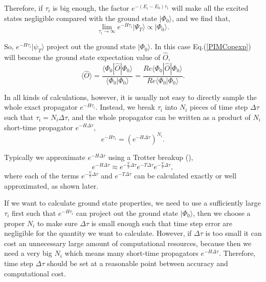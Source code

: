 \documentclass[12pt,letterpaper,UTF8]{report}
\begin{document}
Therefore, if $\tau_i$ is big enough, the factor $e^{-(E_i-E_0) \tau_1}$ will make all the excited states negligible compared with the ground state $| \Phi_0 \rangle$, and we find that,
\begin{equation}
\lim_{\tau_i \rightarrow \infty } e^{-H \tau_i} | \Psi_T  \rangle \propto | \Phi_0 \rangle.
\end{equation}

So, $e^{-H \tau_i} | \psi_T \rangle$ project out the ground state $| \Phi_0 \rangle$.
In this case Eq.(\ref{PIMCopexp}) will become the ground state expectation value of $\hat{O}$,
\begin{equation}
\langle \hat{O} \rangle  = \frac{ \langle \Phi_0 | \hat{O}   | \Phi_0  \rangle }   { \langle \Phi_0 | \Phi_0  \rangle  }
=\frac{ Re \langle \Phi_0 | \hat{O}   | \Phi_0  \rangle }   { Re \langle \Phi_0 | \Phi_0  \rangle  }. \label{PIMCopgndexp}
\end{equation}

In all kinds of calculations, however, it is usually not easy to directly sample the whole exact propagator $e^{-H \tau_i}$.
Instead, we break $\tau_i$ into $N_i$ pieces of time step $\Delta \tau $ such that $\tau_i=N_i \Delta \tau$, and the whole propagator can be written as a product of $N_i$ short-time propagator $e^{-H \Delta \tau}$,
\begin{equation}
e^{-H \tau_i}=  (e^{-H \Delta \tau})^{N_i} . \label{wholepropagator}
\end{equation}

Typically we approximate $e^{-H \Delta \tau}$ using a Trotter breakup (\cite{SchmidtLee95a}),
\begin{equation}
e^{-H \Delta \tau}  \approx e^{-\frac{V}{2} \Delta \tau}e^{- T \Delta \tau}e^{- \frac{V}{2} \Delta \tau} ,
\label{Trotter}
\end{equation}
where each of the terms $e^{-\frac{V}{2} \Delta \tau}$ and $e^{- T \Delta \tau}$ can be calculated exactly or well approximated, as shown later.

If we want to calculate ground state properties, we need to use a sufficiently large $\tau_i$ first such that $e^{-H \tau_i}$ can project out the ground state $|\Phi_0\rangle$, then we choose a proper $N_i$ to make sure $\Delta \tau$ is small enough such that time step error are negligible for the quantity we want to calculate.
However, if $\Delta \tau$ is too small it can cost an unnecessary large amount of computational resources, because then we need a very big $N_i$ which means many short-time propagators $e^{-H \Delta \tau}$.
Therefore, time step $\Delta \tau$ should be set at a reasonable point between accuracy and computational cost.
\end{document}
